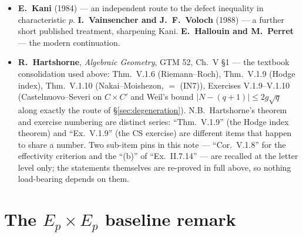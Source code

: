 \documentclass[11pt]{article}
\theoremstyle{definition}
\theoremstyle{remark}
\begin{document}
\begin{itemize}
  $l(D + D') \ge l(D')$ if $l(D) > 0$, and (2.4) $l(D) > 1 \Rightarrow D \cdot H > 0$ for a
  hyperplane section (this note's (IN3)). His (2.3) has no counterpart in (IN1)--(IN7).
\item \textbf{E.~Kani} (1984) \cite{Kani} --- an independent route to the defect inequality in
  characteristic $p$. \textbf{I.~Vainsencher and J.~F.~Voloch} (1988) \cite{VV} --- a further
  short published treatment, sharpening Kani. \textbf{E.~Hallouin and M.~Perret} \cite{HP} ---
  the modern continuation.
\item \textbf{R.~Hartshorne}, \emph{Algebraic Geometry}, GTM 52, Ch.~V \S1
  \cite{Hartshorne} --- the textbook consolidation used above: Thm.~V.1.6 (Riemann--Roch),
  Thm.~V.1.9 (Hodge index), Thm.~V.1.10 (Nakai--Moishezon, $=$ (IN7)), Exercises
  V.1.9--V.1.10 (Castelnuovo--Severi on $C \times C'$ and Weil's bound
  $|N - (q + 1)| \le 2g\sqrt{q}$ along exactly the route of \S\ref{sec:degeneration}).
  N.B.\ Hartshorne's theorem and exercise numbering are distinct series: ``Thm.~V.1.9''
  (the Hodge index theorem) and ``Ex.~V.1.9'' (the CS exercise) are different items that
  happen to share a number. Two sub-item pins in this note --- ``Cor.~V.1.8'' for the
  effectivity criterion and the ``(b)'' of ``Ex.~II.7.14'' --- are recalled at the letter
  level only; the statements themselves are re-proved in full above, so nothing
  load-bearing depends on them.
\end{itemize}

\section{The \texorpdfstring{$E_p \times E_p$}{Ep x Ep} baseline remark}
\label{sec:baseline}
\end{document}
